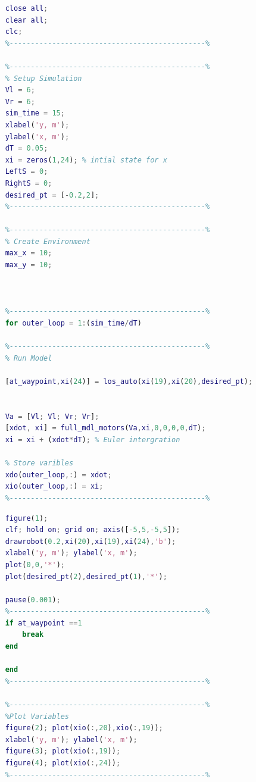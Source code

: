 \documentclass{l4proj}
\begin{document}
\begin{lstlisting}[language=Matlab, float, caption={Task 1 ,Single desired Point (Test 1)}, label=lst:callahan]
     % Workspace Clear up
    close all;
    clear all;
    clc;
    %----------------------------------------------%
    
    %----------------------------------------------%
    % Setup Simulation
    Vl = 6;
    Vr = 6;
    sim_time = 15;
    xlabel('y, m'); 
    ylabel('x, m');
    dT = 0.05;
    xi = zeros(1,24); % intial state for x
    LeftS = 0;
    RightS = 0;
    desired_pt = [-0.2,2];
    %----------------------------------------------%
    
    %----------------------------------------------%
    % Create Environment
    max_x = 10;
    max_y = 10;
    
    
    
    %----------------------------------------------%
    for outer_loop = 1:(sim_time/dT)

    %----------------------------------------------%
    % Run Model
    
    [at_waypoint,xi(24)] = los_auto(xi(19),xi(20),desired_pt);
    
    
    Va = [Vl; Vl; Vr; Vr];
    [xdot, xi] = full_mdl_motors(Va,xi,0,0,0,0,dT);   
    xi = xi + (xdot*dT); % Euler intergration
    
    % Store varibles
    xdo(outer_loop,:) = xdot;
    xio(outer_loop,:) = xi;
    %----------------------------------------------%
        \end{lstlisting}
 \begin{lstlisting}[language=Matlab, float, caption={Task 1 ,Single desired Point (Test 1)}, label=lst:callahan]   
    %----------------------------------------------%
    figure(1);
    clf; hold on; grid on; axis([-5,5,-5,5]);
    drawrobot(0.2,xi(20),xi(19),xi(24),'b');
    xlabel('y, m'); ylabel('x, m');
    plot(0,0,'*');
    plot(desired_pt(2),desired_pt(1),'*');
    
    pause(0.001);
    %----------------------------------------------%
    if at_waypoint ==1
        break
    end

    end
    %----------------------------------------------%
    
    %----------------------------------------------%
    %Plot Variables
    figure(2); plot(xio(:,20),xio(:,19));
    xlabel('y, m'); ylabel('x, m');
    figure(3); plot(xio(:,19));
    figure(4); plot(xio(:,24));
    %----------------------------------------------%    
    \end{lstlisting}
\end{document}
